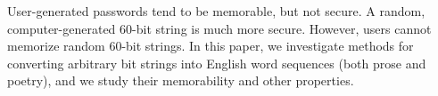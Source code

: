 User-generated passwords tend to be memorable, but not secure. A random, computer-generated 60-bit string is much more secure.  However, users cannot memorize random 60-bit strings.  In this paper, we investigate methods for converting arbitrary bit strings into English word sequences (both prose and poetry), and we study their memorability and other properties.
